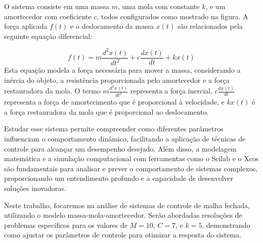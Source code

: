 O sistema consiste em uma massa \( m \), uma mola com constante \( k \), e um amortecedor com coeficiente \( c \), todos configurados como mostrado na figura. A força aplicada \( f(t) \) e o deslocamento da massa \( x(t) \) são relacionados pela seguinte equação diferencial:

\[
    f(t) = m \frac{d^2x(t)}{dt^2} + c \frac{dx(t)}{dt} + kx(t)
\]
Esta equação modela a força necessária para mover a massa, considerando a inércia do objeto, a resistência proporcionada pelo amortecedor e a força restauradora da mola. O termo \( m \frac{d^2x(t)}{dt^2} \) representa a força inercial, \( c \frac{dx(t)}{dt} \) representa a força de amortecimento que é proporcional à velocidade, e \( kx(t) \) é a força restauradora da mola que é proporcional ao deslocamento.

Estudar esse sistema permite compreender como diferentes parâmetros influenciam o comportamento dinâmico, facilitando a aplicação de técnicas de controle para alcançar um desempenho desejado. Além disso, a modelagem matemática e a simulação computacional com ferramentas como o Scilab e o Xcos são fundamentais para analisar e prever o comportamento de sistemas complexos, proporcionando um entendimento profundo e a capacidade de desenvolver soluções inovadoras.

Neste trabalho, focaremos na análise de sistemas de controle de malha fechada, utilizando o modelo massa-mola-amortecedor. Serão abordadas resoluções de problemas específicos para os valores de \( M = 10 \), \( C = 7 \), e \( k = 5 \), demonstrando como ajustar os parâmetros de controle para otimizar a resposta do sistema.
